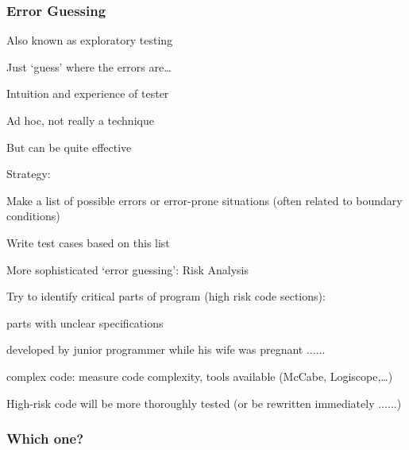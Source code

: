 \subsubsection{Error Guessing}
Also known as exploratory testing
\begin{itemize*}
	\item Just `guess’ where the errors are\ldots
	\item Intuition and experience of tester
	\item Ad hoc, not really a technique
	\item But can be quite effective
	\item Strategy:
	\begin{itemize*}
		\item Make a list of possible errors or error-prone situations (often related to boundary conditions)
		\item Write test cases based on this list
	\end{itemize*}
	\item More sophisticated `error guessing': Risk Analysis
	\item Try to identify critical parts of program
	(high risk code sections):
	\begin{itemize*}
		\item parts with unclear specifications
		\item developed by junior programmer while his wife was pregnant $\ldots\ldots$
		\item complex code:
		measure code complexity, tools available (McCabe, Logiscope,\ldots)
	\end{itemize*}
	\item High-risk code will be more thoroughly tested (or be rewritten immediately $\ldots\ldots$)
	
\end{itemize*}

\subsubsection{Which one?}


